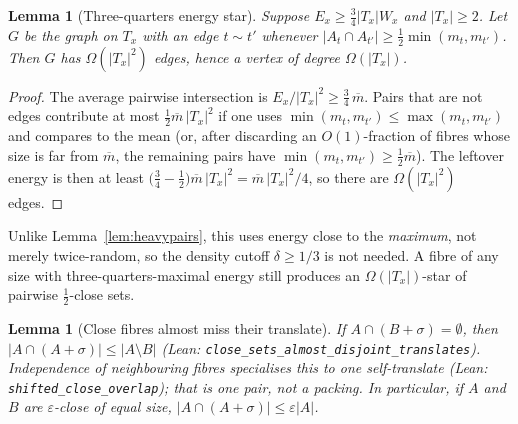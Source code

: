 \documentclass[11pt]{article}
\newtheorem{lemma}[theorem]{Lemma}
\theoremstyle{definition}
\begin{document}
\begin{lemma}[Three-quarters energy star]\label{lem:34star}
Suppose $E_x\ge\tfrac34|T_x|W_x$ and $|T_x|\ge 2$.
Let $G$ be the graph on $T_x$ with an edge $t\sim t'$ whenever
$|A_t\cap A_{t'}|\ge\tfrac12\min(m_t,m_{t'})$.
Then $G$ has $\Omega(|T_x|^{2})$ edges, hence a vertex of degree $\Omega(|T_x|)$.
\end{lemma}

\begin{proof}
The average pairwise intersection is $E_x/|T_x|^{2}\ge\tfrac34\,\overline m$.
Pairs that are not edges contribute at most
$\tfrac12\overline m\,|T_x|^{2}$ if one uses
$\min(m_t,m_{t'})\le\max(m_t,m_{t'})$ and compares to the mean
(or, after discarding an $O(1)$-fraction of fibres whose size is
far from $\overline m$, the remaining pairs have
$\min(m_t,m_{t'})\ge\tfrac12\overline m$).
The leftover energy is then at least
$\bigl(\tfrac34-\tfrac12\bigr)\overline m\,|T_x|^{2}=\overline m\,|T_x|^{2}/4$,
so there are $\Omega(|T_x|^{2})$ edges.
\end{proof}

Unlike Lemma~\ref{lem:heavypairs}, this uses energy close to the
\emph{maximum}, not merely twice-random, so the density cutoff $\delta\ge 1/3$
is not needed.
A fibre of any size with three-quarters-maximal energy still produces an
$\Omega(|T_x|)$-star of pairwise $\tfrac12$-close sets.

\begin{lemma}[Close fibres almost miss their translate]\label{lem:close}
If $A\cap(B+\sigma)=\emptyset$, then $|A\cap(A+\sigma)|\le|A\setminus B|$
(Lean: \texttt{close\_sets\_almost\_disjoint\_translates}).
Independence of neighbouring fibres specialises this to one self-translate
(Lean: \texttt{shifted\_close\_overlap}); that is one pair, not a packing.
In particular, if $A$ and $B$ are $\varepsilon$-close of equal size, $|A\cap(A+\sigma)|\le\varepsilon|A|$.
\end{lemma}
\end{document}

